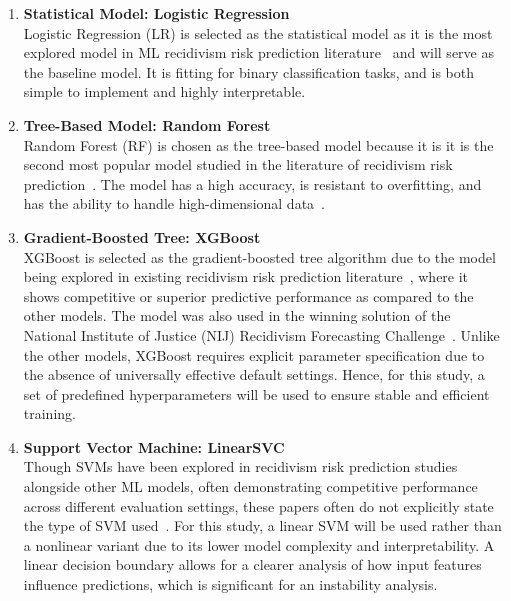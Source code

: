 \documentclass[12pt]{article}
\begin{document}
\begin{enumerate}
 \item \textbf{Statistical Model: Logistic Regression} \\
  \tab Logistic Regression (LR) is selected as the statistical model as it is the most explored model in ML recidivism risk prediction literature~\cite{travaini2022machine} and will serve as the baseline model. It is fitting for binary classification tasks, and is both simple to implement and highly interpretable. 

 \item \textbf{Tree-Based Model: Random Forest}\\
  \tab Random Forest (RF) is chosen as the tree-based model because it is it is the second most popular model studied in the literature of recidivism risk prediction~\cite{travaini2022machine}. The model has a high accuracy, is resistant to overfitting, and has the ability to handle high-dimensional data~\cite{kovalchuk2023prediction}.

 \item \textbf{Gradient-Boosted Tree: XGBoost}\\
  \tab XGBoost is selected as the gradient-boosted tree algorithm due to the model being explored in existing recidivism risk prediction literature~\cite{won2019recidivism,rajendran2021predicting}, where it shows competitive or superior predictive performance as compared to the other models. The model was also used in the winning solution of the National Institute of Justice (NIJ) Recidivism Forecasting Challenge~\cite{han2022xgboost}. Unlike the other models, XGBoost requires explicit parameter specification due to the absence of universally effective default settings. Hence, for this study, a set of predefined hyperparameters will be used to ensure stable and efficient training. 

 \item \textbf{Support Vector Machine: LinearSVC}\\
  \tab Though SVMs have been explored in recidivism risk prediction studies alongside other ML models, often demonstrating competitive performance across different evaluation settings, these papers often do not explicitly state the type of SVM used~\cite{duwe2017out, tolan2019machine,ozkan2017predicting}. For this study, a linear SVM will be used rather than a nonlinear variant due to its lower model complexity and interpretability. A linear decision boundary allows for a clearer analysis of how input features influence predictions, which is significant for an instability analysis. 
  

\end{enumerate}
\end{document}
